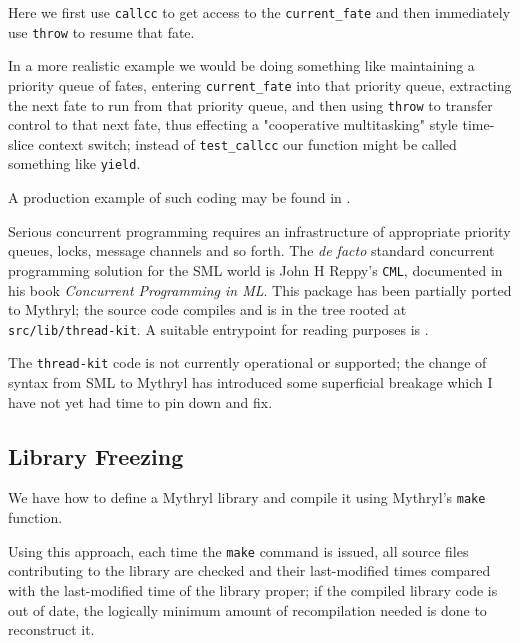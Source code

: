 Here we first use {\tt callcc} to get access to the {\tt current\_fate} 
and then immediately use {\tt throw} to resume that fate.

In a more realistic example we would be doing something like maintaining 
a priority queue of fates, entering {\tt current\_fate} into 
that priority queue, extracting the next fate to run from that 
priority queue, and then using {\tt throw} to transfer control to that 
next fate, thus effecting a "cooperative multitasking" style 
time-slice  context switch;  instead of {\tt test\_callcc} our function 
might be called something like {\tt yield}.

A production example of such coding may be found in 
.

Serious concurrent programming requires an infrastructure of appropriate 
priority queues, locks, message channels and so forth.  The {\it de facto} 
standard concurrent programming solution for the SML world is John H Reppy's 
{\tt CML}, documented in his book {\it Concurrent Programming in ML}.  This 
package has been partially ported to Mythryl;  the source code compiles and is in the 
tree rooted at {\tt src/lib/thread-kit}.  A suitable entrypoint for reading 
purposes is .

The {\tt thread-kit} code is not currently operational or supported;  the change of syntax 
from SML to Mythryl has introduced some superficial breakage which I have 
not yet had time to pin down and fix.


\cutend*

\subsection{Library Freezing}
\label{section:tut:full-monte:library-freezing}

We have  
how to define a Mythryl library and compile it using Mythryl's {\tt make} function.

Using this approach, each time the {\tt make} command is issued, all source files 
contributing to the library are checked and their last-modified times compared with 
the last-modified time of the library proper;  if the compiled library code is 
out of date, the logically minimum amount of recompilation needed is done to 
reconstruct it.

